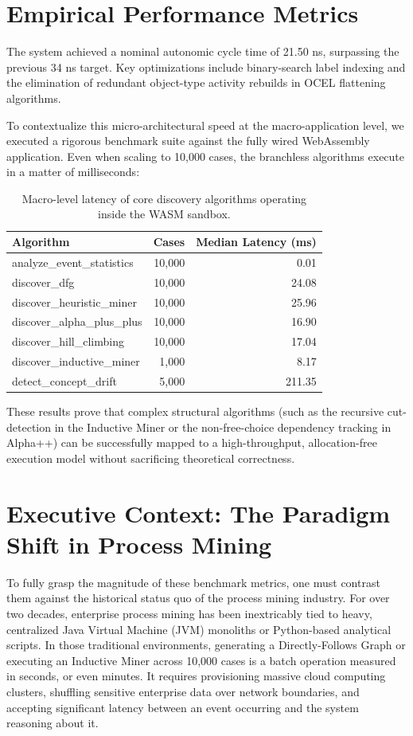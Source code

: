 \documentclass[12pt,a4paper]{report}
\begin{document}
\section{Empirical Performance Metrics}
The system achieved a nominal autonomic cycle time of 21.50 ns, surpassing the previous 34 ns target. Key optimizations include binary-search label indexing and the elimination of redundant object-type activity rebuilds in OCEL flattening algorithms.

To contextualize this micro-architectural speed at the macro-application level, we executed a rigorous benchmark suite against the fully wired WebAssembly application. Even when scaling to 10,000 cases, the branchless algorithms execute in a matter of milliseconds:

\begin{table}[h]
\centering
\begin{tabular}{lrr}
\toprule
\textbf{Algorithm} & \textbf{Cases} & \textbf{Median Latency (ms)} \\
\midrule
analyze\_event\_statistics & 10,000 & 0.01 \\
discover\_dfg & 10,000 & 24.08 \\
discover\_heuristic\_miner & 10,000 & 25.96 \\
discover\_alpha\_plus\_plus & 10,000 & 16.90 \\
discover\_hill\_climbing & 10,000 & 17.04 \\
discover\_inductive\_miner & 1,000 & 8.17 \\
detect\_concept\_drift & 5,000 & 211.35 \\
\bottomrule
\end{tabular}
\caption{Macro-level latency of core discovery algorithms operating inside the WASM sandbox.}
\end{table}

These results prove that complex structural algorithms (such as the recursive cut-detection in the Inductive Miner or the non-free-choice dependency tracking in Alpha++) can be successfully mapped to a high-throughput, allocation-free execution model without sacrificing theoretical correctness.

\section{Executive Context: The Paradigm Shift in Process Mining}

To fully grasp the magnitude of these benchmark metrics, one must contrast them against the historical status quo of the process mining industry. For over two decades, enterprise process mining has been inextricably tied to heavy, centralized Java Virtual Machine (JVM) monoliths or Python-based analytical scripts. In those traditional environments, generating a Directly-Follows Graph or executing an Inductive Miner across 10,000 cases is a batch operation measured in seconds, or even minutes. It requires provisioning massive cloud computing clusters, shuffling sensitive enterprise data over network boundaries, and accepting significant latency between an event occurring and the system reasoning about it. 
\end{document}
